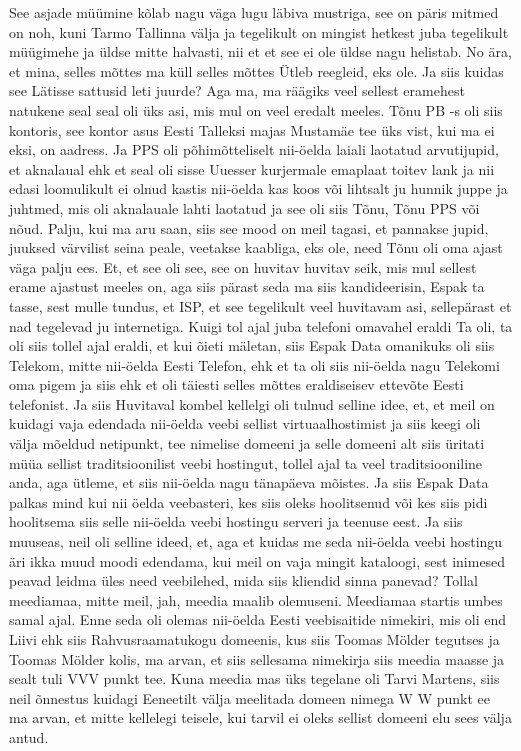 See asjade müümine kõlab nagu väga lugu läbiva mustriga, see on päris mitmed on noh, kuni Tarmo Tallinna välja ja tegelikult on mingist hetkest juba tegelikult müügimehe ja üldse mitte halvasti, nii et et see ei ole üldse nagu helistab.
No ära, et mina, selles mõttes ma küll selles mõttes
Ütleb reegleid, eks ole. Ja siis kuidas see Lätisse sattusid leti juurde?
Aga ma, ma räägiks veel sellest eramehest natukene seal seal oli üks asi, mis mul on veel eredalt meeles. Tõnu PB -s oli siis kontoris, see kontor asus Eesti Talleksi majas Mustamäe tee üks vist, kui ma ei eksi, on aadress. Ja PPS oli põhimõtteliselt nii-öelda laiali laotatud arvutijupid, et aknalaual ehk et seal oli sisse Uuesser kurjermale emaplaat toitev lank ja nii edasi loomulikult ei olnud kastis nii-öelda kas koos või lihtsalt ju hunnik juppe ja juhtmed, mis oli aknalauale lahti laotatud ja see oli siis Tõnu, Tõnu PPS või nõud.
Palju, kui ma aru saan, siis see mood on meil tagasi, et pannakse jupid, juuksed värvilist seina peale, veetakse kaabliga, eks ole, need Tõnu oli oma ajast väga palju ees.
Et, et see oli see, see on huvitav huvitav seik, mis mul sellest erame ajastust meeles on, aga siis pärast seda ma siis kandideerisin, Espak ta tasse, sest mulle tundus, et ISP, et see tegelikult veel huvitavam asi, sellepärast et nad tegelevad ju internetiga.
Kuigi tol ajal juba telefoni omavahel eraldi
Ta oli, ta oli siis tollel ajal eraldi, et kui õieti mäletan, siis Espak Data omanikuks oli siis Telekom, mitte nii-öelda Eesti Telefon, ehk et ta oli siis nii-öelda nagu Telekomi oma pigem ja siis ehk et oli täiesti selles mõttes eraldiseisev ettevõte Eesti telefonist. Ja siis
Huvitaval kombel kellelgi oli tulnud selline idee, et, et meil on kuidagi vaja edendada nii-öelda veebi sellist virtuaalhostimist ja siis keegi oli välja mõeldud netipunkt, tee nimelise domeeni ja selle domeeni alt siis üritati müüa sellist traditsioonilist veebi hostingut, tollel ajal ta veel traditsiooniline anda, aga ütleme, et siis nii-öelda nagu tänapäeva mõistes. Ja siis Espak Data palkas mind kui nii öelda veebasteri, kes siis oleks hoolitsenud või kes siis pidi hoolitsema siis selle nii-öelda veebi hostingu serveri ja teenuse eest. Ja siis muuseas, neil oli selline ideed, et, aga et kuidas me seda nii-öelda veebi hostingu äri ikka muud moodi edendama, kui meil on vaja mingit kataloogi, sest inimesed peavad leidma üles need veebilehed, mida siis kliendid sinna panevad?
Tollal meediamaa, mitte meil, jah, meedia maalib olemuseni.
Meediamaa startis umbes samal ajal. Enne seda oli olemas nii-öelda Eesti veebisaitide nimekiri, mis oli end Liivi ehk siis Rahvusraamatukogu domeenis, kus siis Toomas Mölder tegutses ja Toomas Mölder kolis, ma arvan, et siis sellesama nimekirja siis meedia maasse ja sealt tuli VVV punkt tee. Kuna meedia mas üks tegelane oli Tarvi Martens, siis neil õnnestus kuidagi Eeneetilt välja meelitada domeen nimega W W punkt ee ma arvan, et mitte kellelegi teisele, kui tarvil ei oleks sellist domeeni elu sees välja antud.
